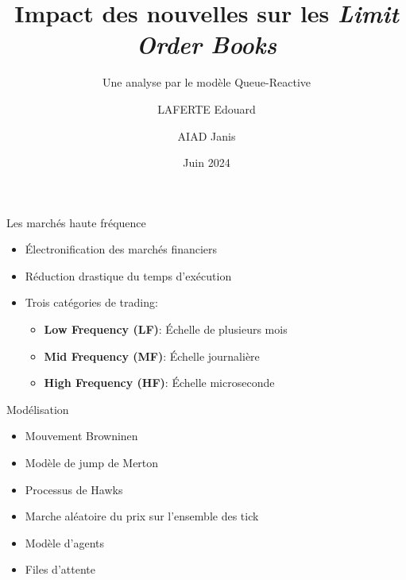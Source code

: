 \documentclass[aspectratio=169]{beamer}  %
\title[Impact des nouvelles sur les LOB]{Impact des nouvelles sur les \textit{Limit Order Books}}
\subtitle{Une analyse par le modèle Queue-Reactive}
\author[LAFERTE \& AIAD]{LAFERTE Edouard \and AIAD Janis}
\institute[École Polytechnique]{
    Département de mathématiques appliquées\\
    École Polytechnique
}
\date{Juin 2024}
\begin{document}
\begin{frame}
    \titlepage
\end{frame}







\begin{frame}{Les marchés haute fréquence}
    \begin{itemize}
        \item Électronification des marchés financiers
        \item Réduction drastique du temps d'exécution
        \item Trois catégories de trading:
        \begin{itemize}
            \item \textbf{Low Frequency (LF)}: Échelle de plusieurs mois
            \item \textbf{Mid Frequency (MF)}: Échelle journalière
            \item \textbf{High Frequency (HF)}: Échelle microseconde
        \end{itemize}
    \end{itemize}
\end{frame}


\begin{frame}{Modélisation}
    \begin{itemize}
        \item Mouvement Browninen 
        \item Modèle de jump de Merton
        \item Processus de Hawks
        \item Marche aléatoire du prix sur l'ensemble des tick
        \item Modèle d'agents
        \item Files d'attente
    \end{itemize}
\end{frame}
\end{document}
